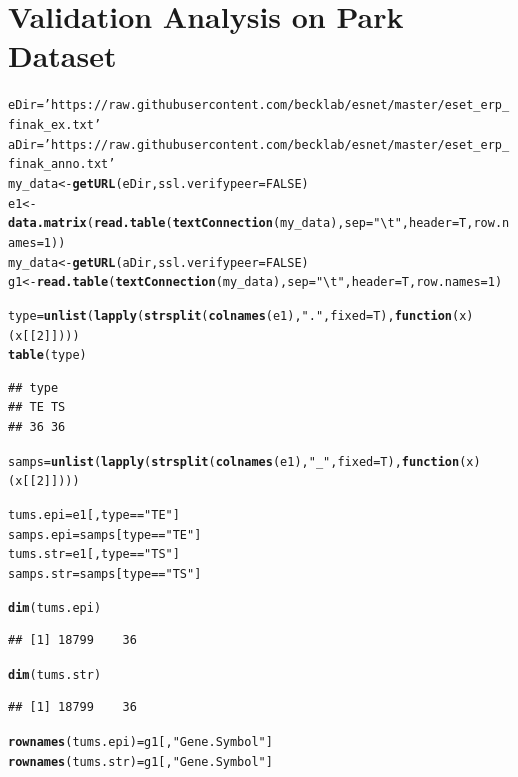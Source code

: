 \documentclass{article}\usepackage[]{graphicx}\usepackage[]{color}
\makeatletter
\newcommand{\hlnum}[1]{\textcolor[rgb]{0.686,0.059,0.569}{#1}}%
\newcommand{\hlstr}[1]{\textcolor[rgb]{0.192,0.494,0.8}{#1}}%
\newcommand{\hlopt}[1]{\textcolor[rgb]{0,0,0}{#1}}%
\newcommand{\hlstd}[1]{\textcolor[rgb]{0.345,0.345,0.345}{#1}}%
\newcommand{\hlkwa}[1]{\textcolor[rgb]{0.161,0.373,0.58}{\textbf{#1}}}%
\newcommand{\hlkwb}[1]{\textcolor[rgb]{0.69,0.353,0.396}{#1}}%
\newcommand{\hlkwc}[1]{\textcolor[rgb]{0.333,0.667,0.333}{#1}}%
\newcommand{\hlkwd}[1]{\textcolor[rgb]{0.737,0.353,0.396}{\textbf{#1}}}%
\newenvironment{kframe}{%
 \def\at@end@of@kframe{}%
 \ifinner\ifhmode%
  \def\at@end@of@kframe{\end{minipage}}%
  \begin{minipage}{\columnwidth}%
 \fi\fi%
 \def\FrameCommand##1{\hskip\@totalleftmargin \hskip-\fboxsep
 \colorbox{shadecolor}{##1}\hskip-\fboxsep
     \hskip-\linewidth \hskip-\@totalleftmargin \hskip\columnwidth}%
 \MakeFramed {\advance\hsize-\width
   \@totalleftmargin\z@ \linewidth\hsize
   \@setminipage}}%
 {\par\unskip\endMakeFramed%
 \at@end@of@kframe}
\newenvironment{knitrout}{}{} %
\makeatother
\begin{document}
\section{Validation Analysis on Park Dataset}
\begin{knitrout}
\color{fgcolor}\begin{kframe}
\begin{alltt}
\hlstd{eDir}\hlkwb{=} \hlstr{'https://raw.githubusercontent.com/becklab/esnet/master/eset_erp_finak_ex.txt'}
\hlstd{aDir} \hlkwb{=} \hlstr{'https://raw.githubusercontent.com/becklab/esnet/master/eset_erp_finak_anno.txt'}
\hlstd{my_data} \hlkwb{<-} \hlkwd{getURL}\hlstd{(eDir,}\hlkwc{ssl.verifypeer}\hlstd{=}\hlnum{FALSE}\hlstd{)}
\hlstd{e1} \hlkwb{<-} \hlkwd{data.matrix}\hlstd{(}\hlkwd{read.table}\hlstd{(}\hlkwd{textConnection}\hlstd{(my_data),}\hlkwc{sep}\hlstd{=}\hlstr{"\textbackslash{}t"}\hlstd{,}\hlkwc{header}\hlstd{=T,}\hlkwc{row.names}\hlstd{=}\hlnum{1}\hlstd{))}
\hlstd{my_data} \hlkwb{<-} \hlkwd{getURL}\hlstd{(aDir,}\hlkwc{ssl.verifypeer}\hlstd{=}\hlnum{FALSE}\hlstd{)}
\hlstd{g1} \hlkwb{<-} \hlkwd{read.table}\hlstd{(}\hlkwd{textConnection}\hlstd{(my_data),}\hlkwc{sep}\hlstd{=}\hlstr{"\textbackslash{}t"}\hlstd{,}\hlkwc{header}\hlstd{=T,}\hlkwc{row.names}\hlstd{=}\hlnum{1}\hlstd{)}

\hlstd{type}\hlkwb{=}\hlkwd{unlist}\hlstd{(}\hlkwd{lapply}\hlstd{(}\hlkwd{strsplit}\hlstd{(}\hlkwd{colnames}\hlstd{(e1),}\hlstr{"."}\hlstd{,}\hlkwc{fixed}\hlstd{=T),}\hlkwa{function}\hlstd{(}\hlkwc{x}\hlstd{)(x[[}\hlnum{2}\hlstd{]])))}
\hlkwd{table}\hlstd{(type)}
\end{alltt}
\begin{verbatim}
## type
## TE TS 
## 36 36
\end{verbatim}
\begin{alltt}
\hlstd{samps}\hlkwb{=}\hlkwd{unlist}\hlstd{(}\hlkwd{lapply}\hlstd{(}\hlkwd{strsplit}\hlstd{(}\hlkwd{colnames}\hlstd{(e1),}\hlstr{"_"}\hlstd{,}\hlkwc{fixed}\hlstd{=T),}\hlkwa{function}\hlstd{(}\hlkwc{x}\hlstd{)(x[[}\hlnum{2}\hlstd{]])))}

\hlstd{tums.epi}\hlkwb{=}\hlstd{e1[,type}\hlopt{==}\hlstr{"TE"}\hlstd{]}
\hlstd{samps.epi}\hlkwb{=}\hlstd{samps[type}\hlopt{==}\hlstr{"TE"}\hlstd{]}
\hlstd{tums.str}\hlkwb{=}\hlstd{e1[,type}\hlopt{==}\hlstr{"TS"}\hlstd{]}
\hlstd{samps.str}\hlkwb{=}\hlstd{samps[type}\hlopt{==}\hlstr{"TS"}\hlstd{]}

\hlkwd{dim}\hlstd{(tums.epi)}
\end{alltt}
\begin{verbatim}
## [1] 18799    36
\end{verbatim}
\begin{alltt}
\hlkwd{dim}\hlstd{(tums.str)}
\end{alltt}
\begin{verbatim}
## [1] 18799    36
\end{verbatim}
\begin{alltt}
\hlkwd{rownames}\hlstd{(tums.epi)}\hlkwb{=}\hlstd{g1[,}\hlstr{"Gene.Symbol"}\hlstd{]}
\hlkwd{rownames}\hlstd{(tums.str)}\hlkwb{=}\hlstd{g1[,}\hlstr{"Gene.Symbol"}\hlstd{]}


\end{alltt}
\end{kframe}
\end{knitrout}
\end{document}
